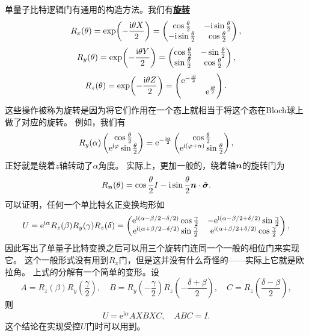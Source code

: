 \documentclass[hyperref, UTF8, a4paper]{ctexart}
\newcommand*{\ii}{\mathrm{i}}
\newcommand*{\ee}{\mathrm{e}}
\newcommand*{\concept}[1]{\underline{\textbf{#1}}}
\begin{document}
单量子比特逻辑门有通用的构造方法。我们有\concept{旋转}
\begin{equation}
    R_x(\theta) = \exp(-\frac{\ii \theta X}{2}) = \pmqty{ \cos \frac{\theta}{2} & - \ii \sin \frac{\theta}{2} \\ - \ii \sin \frac{\theta}{2} & \cos \frac{\theta}{2} },
\end{equation}
\begin{equation}
    R_y(\theta) = \exp(-\frac{\ii \theta Y}{2}) = \pmqty{ \cos \frac{\theta}{2} & - \sin \frac{\theta}{2} \\ \sin \frac{\theta}{2} & \cos \frac{\theta}{2} },
\end{equation}
\begin{equation}
    R_z(\theta) = \exp(-\frac{\ii \theta Z}{2}) = \pmqty{\dmat{\ee^{- \frac{\ii \theta}{2}}, \ee^{\frac{\ii \theta}{2}}}}.
\end{equation}
这些操作被称为旋转是因为将它们作用在一个态上就相当于将这个态在Bloch球上做了对应的旋转。
例如，我们有
\[
    R_y(\alpha) \pmqty{\cos\frac{\theta}{2} \\ \ee^{\ii \varphi} \sin\frac{\theta}{2} } = \ee^{- \frac{\ii \alpha}{2}} \pmqty{ \cos\frac{\theta}{2} \\ \ee^{\ii (\varphi + \alpha)} \sin\frac{\theta}{2} },
\]
正好就是绕着$z$轴转动了$\alpha$角度。
实际上，更加一般的，绕着轴$\vb*{n}$的旋转门为
\begin{equation}
    R_{\vb*{n}}(\theta) = \cos \frac{\theta}{2} I - \ii \sin \frac{\theta}{2} \vb*{n} \cdot \hat{\vb*{\sigma}}.
\end{equation}
可以证明，任何一个单比特幺正变换均形如
\begin{equation}
    U = \ee^{\ii \alpha} R_z(\beta) R_y(\gamma) R_z(\delta) = \pmqty{ \ee^{\ii (\alpha - \beta/2 - \delta / 2)} \cos \frac{\gamma}{2} & - \ee^{\ii (\alpha - \beta/2 + \delta / 2)} \sin \frac{\gamma}{2} \\ \ee^{\ii (\alpha + \beta/2 - \delta / 2)} \sin \frac{\gamma}{2} & \ee^{\ii (\alpha + \beta/2 + \delta / 2)} \cos \frac{\gamma}{2} },
\end{equation}
因此写出了单量子比特变换之后可以用三个旋转门连同一个一般的相位门来实现它。
这个一般形式没有用到$R_x$门，但是这并没有什么奇怪的——实际上它就是欧拉角。
上式的分解有一个简单的变形。设
\begin{equation}
    A = R_z(\beta) R_y \left( \frac{\gamma}{2} \right), \quad B = R_y\left( - \frac{\gamma}{2} \right) R_z\left( - \frac{\delta + \beta}{2} \right), \quad C = R_z\left( \frac{\delta - \beta}{2} \right),
    \label{eq:abc-decomposition}
\end{equation}
则
\begin{equation}
    U = \ee^{\ii \alpha} A X B X C, \quad ABC = I.
\end{equation}
这个结论在实现受控$U$门时可以用到。
\end{document}

